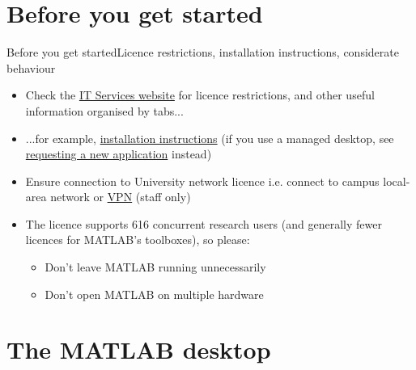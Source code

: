 \documentclass{beamer}
\begin{document}
\section{Before you get started}
\begin{frame}{Before you get started}{Licence restrictions, installation instructions, considerate behaviour}
	\begin{itemize}
		\item Check the \href{https://www.applications.itservices.manchester.ac.uk/show_product.php?id=98&tab=licensing}{IT Services website} for licence restrictions, and other useful information organised by tabs...
		\item ...for example,  \href{https://www.applications.itservices.manchester.ac.uk/show_product.php?id=98&tab=install}{installation instructions} (if you use a managed desktop, see \href{http://www.itservices.manchester.ac.uk/our-services/desktop/your-desktop/windows7/applications/}{requesting a new application} instead)
		\item Ensure connection to University network licence i.e. connect to campus local-area network or \href{http://www.itservices.manchester.ac.uk/our-services/my-it/vpn/}{VPN} (staff only)
		\item The licence supports 616 concurrent research users (and generally fewer licences for MATLAB's toolboxes), so please:
		\begin{itemize}
			\item Don't leave MATLAB running unnecessarily
			\item Don't open MATLAB on multiple hardware
		\end{itemize}
	\end{itemize}
\end{frame}

\section{The MATLAB desktop}
\end{document}
